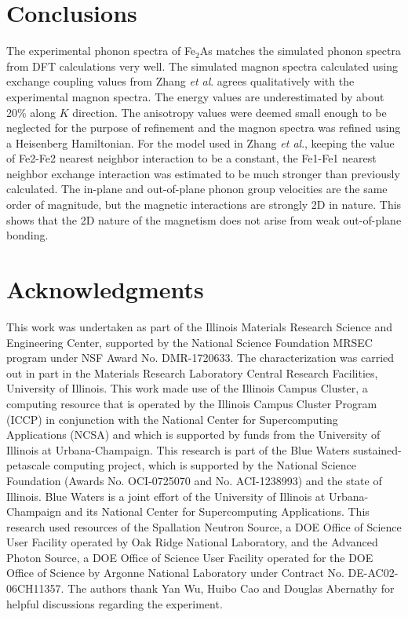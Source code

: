 \documentclass[10pt,doublespacing,edeposit]{uiucthesis2020}
\begin{document}
\begin{mainmatter}
\section{Conclusions}

The experimental phonon spectra of Fe$_2$As matches the simulated phonon spectra from DFT calculations very well. The simulated magnon spectra calculated using exchange coupling values from Zhang \emph{et al}. agrees qualitatively with the experimental magnon spectra. The energy values are underestimated by about 20\% along $K$ direction. The anisotropy values were deemed small enough to be neglected for the purpose of refinement and the magnon spectra was refined using a Heisenberg Hamiltonian. For the model used in Zhang \emph{et al}., keeping the value of Fe2-Fe2 nearest neighbor interaction to be a constant, the Fe1-Fe1 nearest neighbor exchange interaction was estimated to be much stronger than previously calculated. 
The in-plane and out-of-plane phonon group velocities are the same order of magnitude, but the magnetic interactions are strongly 2D in nature. This shows that the 2D nature of the magnetism does not arise from weak out-of-plane bonding.

\section{Acknowledgments}

This work was undertaken as part of the Illinois Materials Research Science and Engineering Center, supported by the National Science Foundation MRSEC program under NSF Award No. DMR-1720633. The characterization was carried out in part in the Materials Research Laboratory Central Research Facilities, University of Illinois. This work made use of the Illinois Campus Cluster, a computing resource that is operated by the Illinois Campus Cluster Program (ICCP) in conjunction with the National Center for Supercomputing Applications (NCSA) and which is supported by funds from the University of Illinois at Urbana-Champaign. This research is part of the Blue Waters sustained-petascale computing project, which is supported by the National Science Foundation (Awards No. OCI-0725070 and No. ACI-1238993) and the state of Illinois. Blue Waters is a joint effort of the University of Illinois at Urbana-Champaign and its National Center for Supercomputing Applications. This research used resources of the Spallation Neutron Source, a DOE Office of Science User Facility operated by Oak Ridge National Laboratory, and the Advanced Photon Source, a DOE Office of Science User Facility operated for the DOE Office of Science by Argonne National Laboratory under Contract No. DE-AC02-06CH11357. The authors thank Yan Wu, Huibo Cao and Douglas Abernathy for helpful discussions regarding the experiment.


\end{mainmatter}
\end{document}
